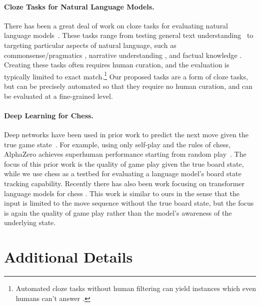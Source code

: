 \documentclass[12pt]{thesis-umich}[thesis]
\begin{document}
\paragraph{Cloze Tasks for Natural Language Models.}
There has been a great deal of work on cloze tasks for evaluating natural language models~\citep{hermann2015cnn, hill2016cbt}. 
These tasks range from testing general text understanding~\citep{paperno-etal-2016-lambada} to targeting particular aspects of natural language, such as commonsense/pragmatics \citep{mostafazadeh-etal-2016-corpus, ettinger2020bert}, narrative understanding \citep{mostafazadeh-etal-2017-lsdsem}, and factual knowledge \citep{petroni-etal-2019-language}.
Creating these tasks often requires human curation, and the evaluation is typically limited to exact match.\footnote{Automated cloze tasks without human filtering can yield instances which even humans can't answer \citep{hill2016cbt}.}  
Our proposed tasks are a form of cloze tasks, but can be precisely 
automated so that they require no human curation, and can be evaluated at a fine-grained level. 


\paragraph{Deep Learning for Chess.}
Deep networks have been used in prior work to predict the next move given the true game state~\cite{david16deepchess, Oshri2015PredictingMI}.
For example, using only self-play and the rules of chess, AlphaZero achieves superhuman performance starting from random play~\citep{silver18general}.
The focus of this prior work is the quality of game play given the true board state, while we use chess as a testbed for evaluating a language model's board state tracking capability.
Recently there has also been work focusing on transformer language models for chess \citep{presser2020chess,cheng2020chess,noever2020chess}. 
This work is similar to ours in the sense that the input is limited to the move sequence without the true board state, but the focus is again the quality of game play rather than the model's awareness of the underlying state. 

 








\section{Additional Details}
\end{document}
